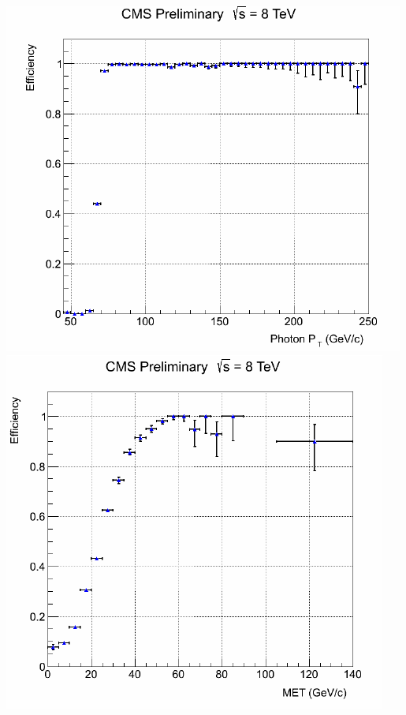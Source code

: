 \begin{center}
\centering
\includegraphics[scale=0.4]{THESISPLOTS/PhotonEfficiencyVsPhotonpt.png}
\includegraphics[scale=0.4]{THESISPLOTS/PhotonEfficiencyVsMET.png}
\label{fig:HLTEff}
\end{center}

